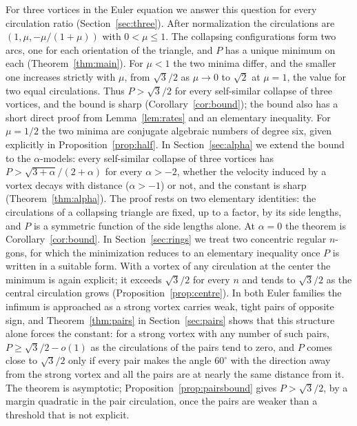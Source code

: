 \documentclass[11pt]{article}
\theoremstyle{definition}
\begin{document}
For three vortices in the Euler equation we answer this question for every circulation ratio (Section~\ref{sec:three}). After normalization the circulations are $(1, \mu, -\mu/(1 + \mu))$ with $0 < \mu \le 1$. The collapsing configurations form two arcs, one for each orientation of the triangle, and $P$ has a unique minimum on each (Theorem~\ref{thm:main}). For $\mu < 1$ the two minima differ, and the smaller one increases strictly with $\mu$, from $\sqrt{3}/2$ as $\mu \to 0$ to $\sqrt{2}$ at $\mu = 1$, the value for two equal circulations. Thus $P > \sqrt{3}/2$ for every self-similar collapse of three vortices, and the bound is sharp (Corollary~\ref{cor:bound}); the bound also has a short direct proof from Lemma~\ref{lem:rates} and an elementary inequality. For $\mu = 1/2$ the two minima are conjugate algebraic numbers of degree six, given explicitly in Proposition~\ref{prop:half}. In Section~\ref{sec:alpha} we extend the bound to the $\alpha$-models: every self-similar collapse of three vortices has $P > \sqrt{3 + \alpha}/(2 + \alpha)$ for every $\alpha > -2$, whether the velocity induced by a vortex decays with distance ($\alpha > -1$) or not, and the constant is sharp (Theorem~\ref{thm:alpha}). The proof rests on two elementary identities: the circulations of a collapsing triangle are fixed, up to a factor, by its side lengths, and $P$ is a symmetric function of the side lengths alone. At $\alpha = 0$ the theorem is Corollary~\ref{cor:bound}. In Section~\ref{sec:rings} we treat two concentric regular $n$-gons, for which the minimization reduces to an elementary inequality once $P$ is written in a suitable form. With a vortex of any circulation at the center the minimum is again explicit; it exceeds $\sqrt{3}/2$ for every $n$ and tends to $\sqrt{3}/2$ as the central circulation grows (Proposition~\ref{prop:centre}). In both Euler families the infimum is approached as a strong vortex carries weak, tight pairs of opposite sign, and Theorem~\ref{thm:pairs} in Section~\ref{sec:pairs} shows that this structure alone forces the constant: for a strong vortex with any number of such pairs, $P \ge \sqrt{3}/2 - o(1)$ as the circulations of the pairs tend to zero, and $P$ comes close to $\sqrt{3}/2$ only if every pair makes the angle $60^\circ$ with the direction away from the strong vortex and all the pairs are at nearly the same distance from it. The theorem is asymptotic; Proposition~\ref{prop:pairsbound} gives $P > \sqrt{3}/2$, by a margin quadratic in the pair circulation, once the pairs are weaker than a threshold that is not explicit.
\end{document}
